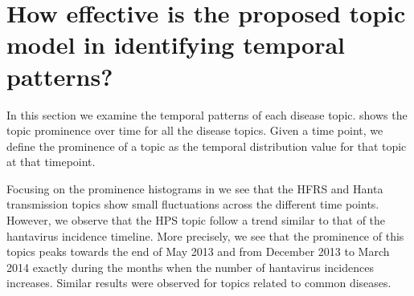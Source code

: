 \documentclass[twoside,leqno,twocolumn]{article}
\begin{document}
\section{How effective is the proposed topic model in identifying temporal patterns?} 
\label{sec:temporal}
In this section we examine the temporal patterns of each disease topic.  shows 
the topic prominence over time for all the disease topics. Given a time point, we define
the prominence of a topic as the temporal distribution value for that topic at that timepoint.

Focusing on the prominence histograms in  we see that the HFRS and Hanta transmission topics
show small fluctuations across the different time points. However, we observe that the HPS topic follow a trend similar to that
of the hantavirus incidence timeline. More precisely, we see that the prominence of this topics peaks towards the end of May 2013 and
from December 2013 to March 2014 exactly during the months when the number of hantavirus incidences increases.
Similar results were observed for topics related to common diseases.
\end{document}
